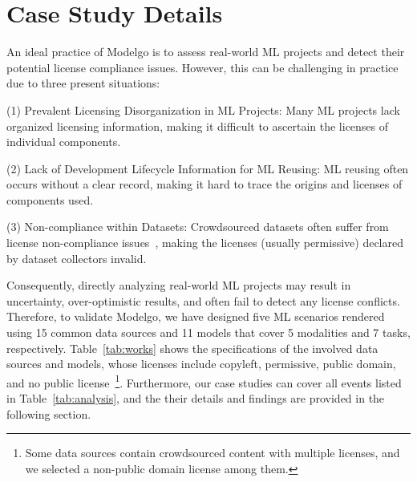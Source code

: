 \section{Case Study Details}
An ideal practice of Modelgo is to assess real-world ML projects and detect their potential license compliance issues. 
However, this can be challenging in practice due to three present situations:

(1) Prevalent Licensing Disorganization in ML Projects: Many ML projects lack organized licensing information, making it difficult to ascertain the licenses of individual components.

(2) Lack of Development Lifecycle Information for ML Reusing: ML reusing often occurs without a clear record, making it hard to trace the origins and licenses of components used.

(3) Non-compliance within Datasets: Crowdsourced datasets often suffer from license non-compliance issues~\cite{rajbahadur2021can}, making the licenses (usually permissive) declared by dataset collectors invalid.

Consequently, directly analyzing real-world ML projects may result in uncertainty, over-optimistic results, and often fail to detect any license conflicts.
Therefore, to validate Modelgo, we have designed five ML scenarios rendered using 15 common data sources and 11 models that cover 5 modalities and 7 tasks, respectively.
Table~\ref{tab:works} shows the specifications of the involved data sources and models, whose licenses include copyleft, permissive, public domain, and no public license~\footnote{Some data sources contain crowdsourced content with multiple licenses, and we selected a non-public domain license among them.}.
Furthermore, our case studies can cover all events listed in Table~\ref{tab:analysis}, and the their details and findings are provided in the following section.

